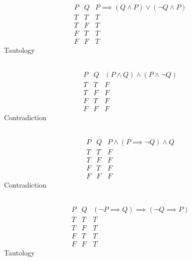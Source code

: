 \documentclass{article}
\begin{document}
\begin{equation}
    \begin{array}{c|c|c}
        P & Q & P \implies (Q \land P) \lor (\lnot Q \land P) \\
        \hline
        T & T & T \\
        T & F & T \\
        F & T & T \\
        F & F & T
    \end{array}
\end{equation}
Tautology

\subsection{}

\begin{equation}
    \begin{array}{c|c|c}
        P & Q & (P \land Q) \land (P \land \lnot Q) \\
        \hline
        T & T & F \\
        T & F & F \\
        F & T & F \\
        F & F & F
    \end{array}
\end{equation}
Contradiction

\subsection{}

\begin{equation}
    \begin{array}{c|c|c}
        P & Q & P \land (P \implies \lnot Q) \land Q \\
        \hline
        T & T & F \\
        T & F & F \\
        F & T & F \\
        F & F & F
    \end{array}
\end{equation}
Contradiction

\subsection{}

\begin{equation}
    \begin{array}{c|c|c}
        P & Q & (\lnot P \implies Q) \implies (\lnot Q \implies P) \\
        \hline
        T & T & T \\
        T & F & T \\
        F & T & T \\
        F & F & T
    \end{array}
\end{equation}
Tautology
\end{document}
